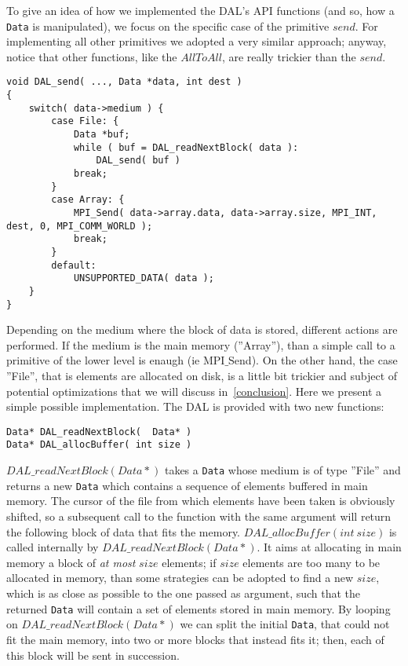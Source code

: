 To give an idea of how we implemented the DAL's API functions (and so, how a \texttt{Data} is manipulated), we focus on the specific case of the primitive $send$. For implementing all other primitives we adopted a very similar approach; anyway, notice that other functions, like the $AllToAll$, are really trickier than the $send$. 
\begin{lstlisting}
void DAL_send( ..., Data *data, int dest )
{
	switch( data->medium ) {
		case File: {
			Data *buf;
			while ( buf = DAL_readNextBlock( data ):
				DAL_send( buf )
			break;
		}
		case Array: {
			MPI_Send( data->array.data, data->array.size, MPI_INT, dest, 0, MPI_COMM_WORLD );
			break;
		}
		default:
			UNSUPPORTED_DATA( data );
	}
}
\end{lstlisting}
Depending on the medium where the block of data is stored, different actions are performed. If the medium is the main memory (''Array''), than a simple call to a primitive of the lower level is enaugh (ie MPI$\_$Send). On the other hand, the case ''File'', that is elements are allocated on disk, is a little bit trickier and subject of potential optimizations that we will discuss in~\ref{conclusion}. Here we present a simple possible implementation. The DAL is provided with two new functions: 
\begin{lstlisting}
Data* DAL_readNextBlock(  Data* )
Data* DAL_allocBuffer( int size )
\end{lstlisting}
$DAL\_readNextBlock( Data* )$ takes a \texttt{Data} whose medium is of type ''File'' and returns a new \texttt{Data} which contains a sequence of elements buffered in main memory. The cursor of the file from which elements have been taken is obviously shifted, so a subsequent call to the function with the same argument will return the following block of data that fits the memory. $DAL\_allocBuffer( int\ size )$ is called internally by $DAL\_readNextBlock( Data* )$. It aims at allocating in main memory a block of \textit{at most} $size$ elements; if $size$ elements are too many to be allocated in memory, than some strategies can be adopted to find a new $size$, which is as close as possible to the one passed as argument, such that the returned \texttt{Data} will contain a set of elements stored in main memory. 
By looping on $DAL\_readNextBlock( Data* )$ we can split the initial \texttt{Data}, that could not fit the main memory, into two or more blocks that instead fits it; then, each of this block will be sent in succession.
